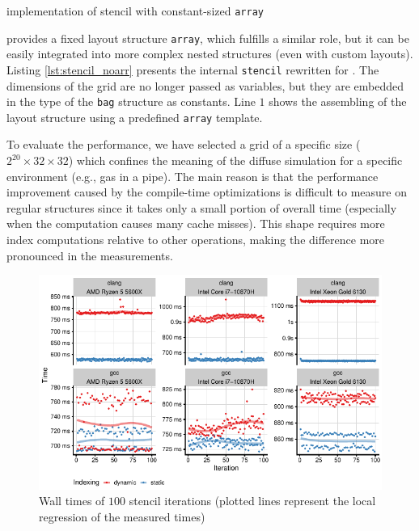 \begin{listing}[h]
  \vspace{-10pt}
  \vspace{-20pt}
  \caption{\Noarr{} implementation of stencil with constant-sized \texttt{array}}
  \label{lst:stencil_noarr}
\end{listing}
\vspace{-10pt}

\Noarr{} provides a fixed layout structure \texttt{array}, which fulfills a similar role, but it can be easily integrated into more complex nested structures (even with custom layouts). Listing \ref{lst:stencil_noarr} presents the internal \texttt{stencil} rewritten for \Noarr{}. The dimensions of the grid are no longer passed as variables, but they are embedded in the type of the \texttt{bag} structure as constants. Line $1$ shows the assembling of the layout structure using a predefined \texttt{array} template.

To evaluate the performance, we have selected a grid of a specific size ($2^{20} \times 32 \times 32$) which confines the meaning of the diffuse simulation for a specific environment (e.g., gas in a pipe). The main reason is that the performance improvement caused by the compile-time optimizations is difficult to measure on regular structures since it takes only a small portion of overall time (especially when the computation causes many cache misses). This shape requires more index computations relative to other operations, making the difference more pronounced in the measurements.

\begin{figure}[h]
  \vspace{-10pt}
	\centering
	\includegraphics{noarr/plots/stencil.pdf}
	\caption{Wall times of $100$ stencil iterations (plotted lines represent the local regression of the measured times)}
	\label{fig:stencil}
  \vspace{-10pt}
\end{figure}

